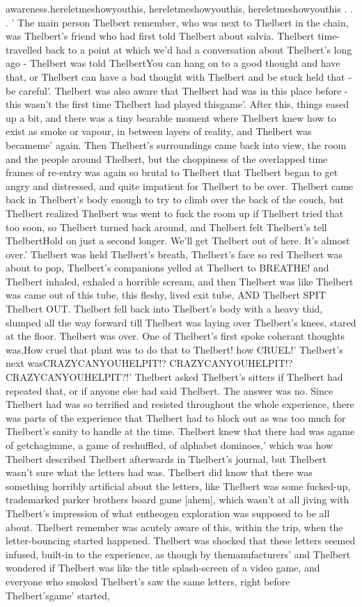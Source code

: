 \documentclass[12pt]{book}
\begin{document}
awareness.hereletmeshowyouthis, hereletmeshowyouthis, hereletmeshowyouthis . . .  ' The main person Thelbert remember, who was next to Thelbert in the chain, was Thelbert's friend who had first told Thelbert about salvia. Thelbert time-travelled back to a point at which we'd had a conversation about Thelbert's long ago - Thelbert was told ThelbertYou can hang on to a good thought and have that, or Thelbert can have a bad thought with Thelbert and be stuck held that - be careful'. Thelbert was also aware that Thelbert had was in this place before - this wasn't the first time Thelbert had played thisgame'. After this, things eased up a bit, and there was a tiny bearable moment where Thelbert knew how to exist as smoke or vapour, in between layers of reality, and Thelbert was becameme' again. Then Thelbert's surroundings came back into view, the room and the people around Thelbert, but the choppiness of the overlapped time frames of re-entry was again so brutal to Thelbert that Thelbert began to get angry and distressed, and quite impatient for Thelbert to be over. Thelbert came back in Thelbert's body enough to try to climb over the back of the couch, but Thelbert realized Thelbert was went to fuck the room up if Thelbert tried that too soon, so Thelbert turned back around, and Thelbert felt Thelbert's tell ThelbertHold on just a second longer. We'll get Thelbert out of here. It's almost over.' Thelbert was held Thelbert's breath, Thelbert's face so red Thelbert was about to pop, Thelbert's companions yelled at Thelbert to BREATHE! and Thelbert inhaled, exhaled a horrible scream, and then Thelbert was like Thelbert was came out of this tube, this fleshy, lived exit tube, AND Thelbert SPIT Thelbert OUT. Thelbert fell back into Thelbert's body with a heavy thid, slumped all the way forward till Thelbert was laying over Thelbert's knees, stared at the floor. Thelbert was over. One of Thelbert's first spoke coherant thoughts was,How cruel that plant was to do that to Thelbert! how CRUEL!' Thelbert's next wasCRAZYCANYOUHELPIT!? CRAZYCANYOUHELPIT!? CRAZYCANYOUHELPIT?!' Thelbert asked Thelbert's sitters if Thelbert had repeated that, or if anyone else had said Thelbert. The answer was no. Since Thelbert had was so terrified and resisted throughout the whole experience, there was parts of the experience that Thelbert had to block out as was too much for Thelbert's sanity to handle at the time. Thelbert knew that there had was agame of getchagimme, a game of reshuffled, of alphabet dominoes,' which was how Thelbert described Thelbert afterwards in Thelbert's journal, but Thelbert wasn't sure what the letters had was. Thelbert did know that there was something horribly artificial about the letters, like Thelbert was some fucked-up, trademarked parker brothers board game [ahem], which wasn't at all jiving with Thelbert's impression of what entheogen exploration was supposed to be all about. Thelbert remember was acutely aware of this, within the trip, when the letter-bouncing started happened. Thelbert was shocked that these letters seemed infused, built-in to the experience, as though by themanufacturers' and Thelbert wondered if Thelbert was like the title splash-screen of a video game, and everyone who smoked Thelbert's saw the same letters, right before Thelbert'sgame' started, 
\end{document}
